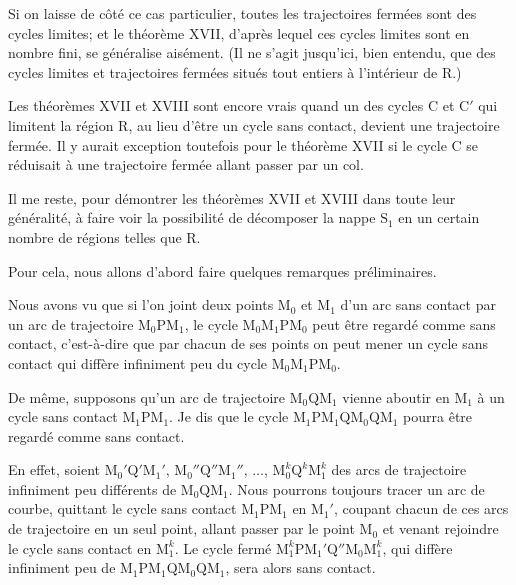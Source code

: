 \documentclass[11pt]{article}
\begin{document}
Si on laisse de côté ce cas particulier, toutes les trajectoires fermées sont des cycles limites; et le théorème XVII, d’après lequel ces cycles limites sont en nombre fini, se généralise aisément. (Il ne s’agit jusqu’ici, bien entendu, que des cycles limites et trajectoires fermées situés tout entiers à l’intérieur de R.)

Les théorèmes XVII et XVIII sont encore vrais quand un des cycles C et C$'$ qui limitent la région R, au lieu d’être un cycle sans contact, devient une trajectoire fermée. Il y aurait exception toutefois pour le théorème XVII si le cycle C se réduisait à une trajectoire fermée allant passer par un col.

Il me reste, pour démontrer les théorèmes XVII et XVIII dans toute leur généralité, à faire voir la possibilité de décomposer la nappe $\mathrm{S}_1$ en un certain nombre de régions telles que R.

Pour cela, nous allons d’abord faire quelques remarques préliminaires.

Nous avons vu que si l’on joint deux points $\mathrm{M}_0$ et $\mathrm{M}_1$ d’un arc sans contact par un arc de trajectoire $\mathrm{M}_0\mathrm{P}\mathrm{M}_1$, le cycle $\mathrm{M}_0\mathrm{M}_1\mathrm{P}\mathrm{M}_0$ peut être regardé comme sans contact, c’est-à-dire que par chacun de ses points on peut mener un cycle sans contact qui diffère infiniment peu du cycle $\mathrm{M}_0\mathrm{M}_1\mathrm{P}\mathrm{M}_0$.

De même, supposons qu’un arc de trajectoire $\mathrm{M}_0\mathrm{Q}\mathrm{M}_1$ vienne aboutir en $\mathrm{M}_1$ à un cycle sans contact $\mathrm{M}_1\mathrm{P}\mathrm{M}_1$. Je dis que le cycle $\mathrm{M}_1\mathrm{P}\mathrm{M}_1\mathrm{Q}\mathrm{M}_0\mathrm{Q}\mathrm{M}_1$ pourra être regardé comme sans contact.

En effet, soient $\mathrm{M}_0'\mathrm{Q}'\mathrm{M}_1'$, $\mathrm{M}_0''\mathrm{Q}''\mathrm{M}_1''$, $\ldots$, $\mathrm{M}_0^k\mathrm{Q}^k\mathrm{M}_1^k$ des arcs de trajectoire infiniment peu différents de $\mathrm{M}_0\mathrm{Q}\mathrm{M}_1$. Nous pourrons toujours tracer un arc de courbe, quittant le cycle sans contact $\mathrm{M}_1\mathrm{P}\mathrm{M}_1$ en $\mathrm{M}_1'$, coupant chacun de ces arcs de trajectoire en un seul point, allant passer par le point $\mathrm{M}_0$ et venant rejoindre le cycle sans contact en $\mathrm{M}_1^k$. Le cycle fermé $\mathrm{M}_1^k\mathrm{P}\mathrm{M}_1'\mathrm{Q}''\mathrm{M}_0\mathrm{M}_1^k$, qui diffère infiniment peu de $\mathrm{M}_1\mathrm{P}\mathrm{M}_1\mathrm{Q}\mathrm{M}_0\mathrm{Q}\mathrm{M}_1$, sera alors sans contact.
\end{document}

